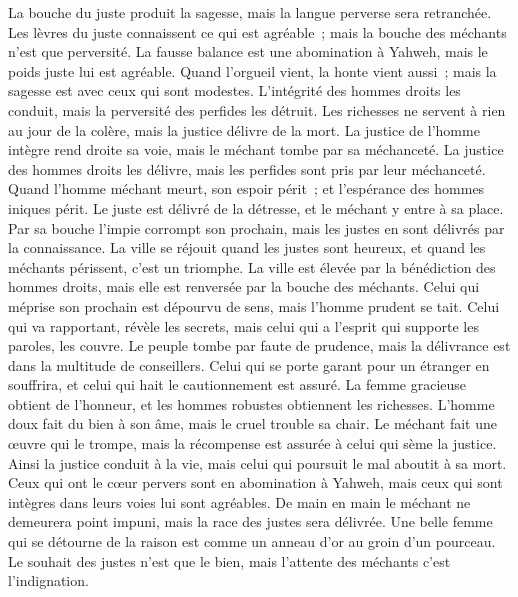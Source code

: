 \begin{multicols}{2}
La bouche du juste produit la sagesse, mais la langue perverse sera retranchée.
Les lèvres du juste connaissent ce qui est agréable~; mais la bouche des méchants n'est que perversité.
\VerseOne{}La fausse balance est une abomination à Yahweh, mais le poids juste lui est agréable.
Quand l'orgueil vient, la honte vient aussi~; mais la sagesse est avec ceux qui sont modestes.
L'intégrité des hommes droits les conduit, mais la perversité des perfides les détruit.
Les richesses ne servent à rien au jour de la colère, mais la justice délivre de la mort.
La justice de l'homme intègre rend droite sa voie, mais le méchant tombe par sa méchanceté.
La justice des hommes droits les délivre, mais les perfides sont pris par leur méchanceté.
Quand l'homme méchant meurt, son espoir périt~; et l'espérance des hommes iniques périt.
Le juste est délivré de la détresse, et le méchant y entre à sa place.
Par sa bouche l'impie corrompt son prochain, mais les justes en sont délivrés par la connaissance.
La ville se réjouit quand les justes sont heureux, et quand les méchants périssent, c'est un triomphe.
La ville est élevée par la bénédiction des hommes droits, mais elle est renversée par la bouche des méchants.
Celui qui méprise son prochain est dépourvu de sens, mais l'homme prudent se tait.
Celui qui va rapportant, révèle les secrets, mais celui qui a l'esprit qui supporte les paroles, les couvre.
Le peuple tombe par faute de prudence, mais la délivrance est dans la multitude de conseillers.
Celui qui se porte garant pour un étranger en souffrira, et celui qui hait le cautionnement est assuré.
La femme gracieuse obtient de l'honneur, et les hommes robustes obtiennent les richesses.
L'homme doux fait du bien à son âme, mais le cruel trouble sa chair.
Le méchant fait une œuvre qui le trompe, mais la récompense est assurée à celui qui sème la justice.
Ainsi la justice conduit à la vie, mais celui qui poursuit le mal aboutit à sa mort.
Ceux qui ont le cœur pervers sont en abomination à Yahweh, mais ceux qui sont intègres dans leurs voies lui sont agréables.
De main en main le méchant ne demeurera point impuni, mais la race des justes sera délivrée.
Une belle femme qui se détourne de la raison est comme un anneau d'or au groin d'un pourceau.
Le souhait des justes n'est que le bien, mais l'attente des méchants c'est l'indignation.

\end{multicols}

